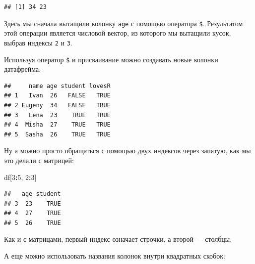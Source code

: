 \documentclass[
]{book}
\newenvironment{Shaded}{\begin{snugshade}}{\end{snugshade}}
\newcommand{\CommentTok}[1]{\textcolor[rgb]{0.56,0.35,0.01}{\textit{#1}}}
\newcommand{\DecValTok}[1]{\textcolor[rgb]{0.00,0.00,0.81}{#1}}
\newcommand{\NormalTok}[1]{#1}
\newcommand{\OperatorTok}[1]{\textcolor[rgb]{0.81,0.36,0.00}{\textbf{#1}}}
\newcommand{\OtherTok}[1]{\textcolor[rgb]{0.56,0.35,0.01}{#1}}
\newcommand{\StringTok}[1]{\textcolor[rgb]{0.31,0.60,0.02}{#1}}
\begin{document}
\begin{Shaded}
\end{Shaded}

\begin{verbatim}
## [1] 34 23
\end{verbatim}

Здесь мы сначала вытащили колонку \texttt{age} с помощью оператора \texttt{\$}. Результатом этой операции является числовой вектор, из которого мы вытащили кусок, выбрав индексы \texttt{2} и \texttt{3}.

Используя оператор \texttt{\$} и присваивание можно создавать новые колонки датафрейма:

\begin{Shaded}
\end{Shaded}

\begin{verbatim}
##     name age student lovesR
## 1   Ivan  26   FALSE   TRUE
## 2 Eugeny  34   FALSE   TRUE
## 3   Lena  23    TRUE   TRUE
## 4  Misha  27    TRUE   TRUE
## 5  Sasha  26    TRUE   TRUE
\end{verbatim}

Ну а можно просто обращаться с помощью двух индексов через запятую, как мы это делали с матрицей:

\begin{Shaded}
\begin{Highlighting}[]
\NormalTok{df[}\DecValTok{3}\OperatorTok{:}\DecValTok{5}\NormalTok{, }\DecValTok{2}\OperatorTok{:}\DecValTok{3}\NormalTok{]}
\end{Highlighting}
\end{Shaded}

\begin{verbatim}
##   age student
## 3  23    TRUE
## 4  27    TRUE
## 5  26    TRUE
\end{verbatim}

Как и с матрицами, первый индекс означает строчки, а второй --- столбцы.

А еще можно использовать названия колонок внутри квадратных скобок:
\end{document}
